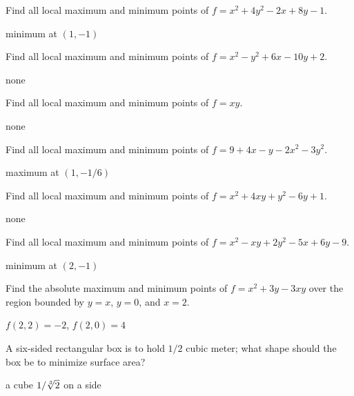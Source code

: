 \begin{exercises}

\begin{exercise} Find all local maximum and minimum points of
$f=x^2+4y^2-2x+8y-1$.
\begin{answer} minimum at $(1,-1)$
\end{answer}\end{exercise}

\begin{exercise} Find all local maximum and minimum points of
$f=x^2-y^2+6x-10y+2$.
\begin{answer} none
\end{answer}\end{exercise}

\begin{exercise} Find all local maximum and minimum points of
$f=xy$.
\begin{answer} none
\end{answer}\end{exercise}

\begin{exercise} Find all local maximum and minimum points of
$f=9+4x-y-2x^2-3y^2$.
\begin{answer} maximum at $(1,-1/6)$
\end{answer}\end{exercise}

\begin{exercise} Find all local maximum and minimum points of
$f=x^2+4xy+y^2-6y+1$.
\begin{answer} none
\end{answer}\end{exercise}

\begin{exercise} Find all local maximum and minimum points of
$f=x^2-xy+2y^2-5x+6y-9$.
\begin{answer} minimum at $(2,-1)$
\end{answer}\end{exercise}

\begin{exercise} Find the absolute maximum and minimum points of
$f=x^2+3y-3xy$ over the region bounded by
$y=x$, $y=0$, and $x=2$.
\begin{answer} $f(2,2)=-2$, $f(2,0)=4$
\end{answer}\end{exercise}

\begin{exercise} A six-sided rectangular box is to hold $1/2$ cubic meter;
what shape should the box be to minimize surface area?
\begin{answer} a cube $1/\root 3 \of {2}$ on a side
\end{answer}\end{exercise}


\end{exercises}
